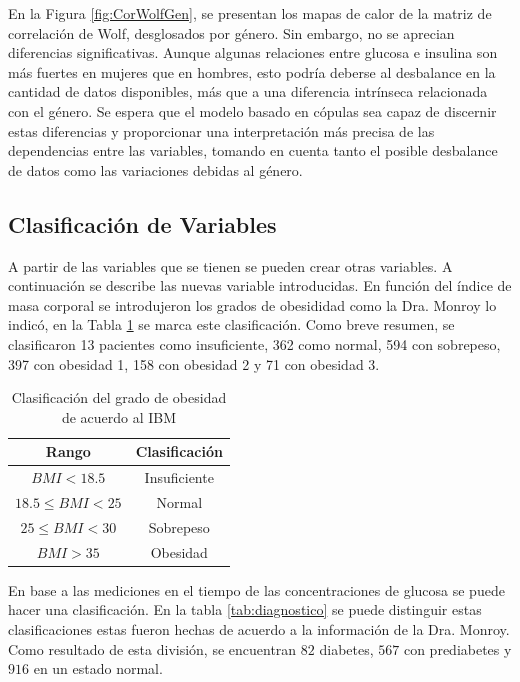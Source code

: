 En la Figura \ref{fig:CorWolfGen}, se presentan los mapas de calor de la matriz de correlación de Wolf, desglosados por género. Sin embargo, no se aprecian diferencias significativas. Aunque algunas relaciones entre glucosa e insulina son más fuertes en mujeres que en hombres, esto podría deberse al desbalance en la cantidad de datos disponibles, más que a una diferencia intrínseca relacionada con el género. Se espera que el modelo basado en cópulas sea capaz de discernir estas diferencias y proporcionar una interpretación más precisa de las dependencias entre las variables, tomando en cuenta tanto el posible desbalance de datos como las variaciones debidas al género.



 \subsection{Clasificación de Variables}

A partir de las variables que se tienen se pueden crear otras variables. A continuación se describe las nuevas variable introducidas.  En función del índice de masa corporal se introdujeron los grados de obesididad como la Dra. Monroy lo indicó, en la Tabla \ref{tab:clasBMI} se marca este clasificación.
Como breve resumen, se clasificaron 13 pacientes como insuficiente, 362 como normal, 594 con sobrepeso, 397 con obesidad 1, 158 con obesidad 2 y 71 con obesidad 3. 
 
\begin{table}[H]
    \centering
    \begin{tabular}{||c|c||}
    \hline\hline
    \textbf{Rango}                  & \textbf{Clasificación} \\ \hline\hline
    $BMI <  18.5$                   & Insuficiente           \\ \hline
    $18.5 \leq BMI < 25$            & Normal                 \\ \hline
    $25\leq BMI<30$                 & Sobrepeso              \\ \hline
    $ BMI > 35$               & Obesidad       \\ \hline\hline
\end{tabular}
\caption{Clasificación del grado de obesidad de acuerdo al IBM}
\label{tab:clasBMI}
\end{table}

En base a las mediciones en el tiempo de las concentraciones de glucosa se puede hacer una clasificación. En la tabla \ref{tab:diagnostico} se puede distinguir estas clasificaciones estas fueron hechas de acuerdo a la información de la Dra. Monroy. Como resultado de esta división, se encuentran $82$ diabetes, $567$ con prediabetes y $916$ en un estado normal.

